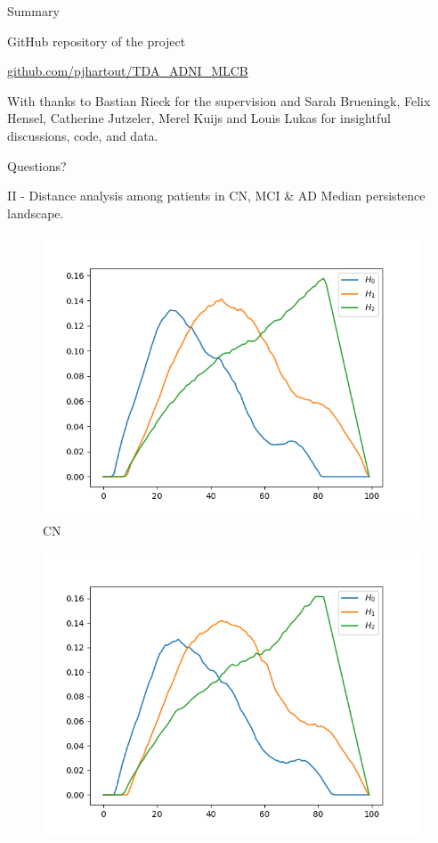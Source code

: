 \documentclass[aspectratio=169, 10pt, dvipsnames]{beamer}
\begin{document}
\begin{frame}{Summary}

  GitHub repository of the project

  \begin{center}\url{github.com/pjhartout/TDA_ADNI_MLCB}\end{center}

  With thanks to Bastian Rieck for the   supervision and Sarah Brueningk, Felix Hensel, Catherine Jutzeler, Merel Kuijs and Louis Lukas for insightful discussions, code, and data.

\end{frame}


\begin{frame}[standout]
  Questions?
\end{frame}

\begin{frame}[fragile]{II - Distance analysis among patients in CN, MCI \& AD}
  Median persistence landscape.\\
  \begin{figure}
    \centering
    \includegraphics[width=\textwidth]{figures/median_pls/median_pl_CN.png}
    \caption{CN}
  \end{figure}
  \endminipage
  \hfill
  \begin{figure}
    \centering
    \includegraphics[width=\textwidth]{figures/median_pls/median_pl_MCI.png}

\end{figure}
\end{frame}
\end{document}
